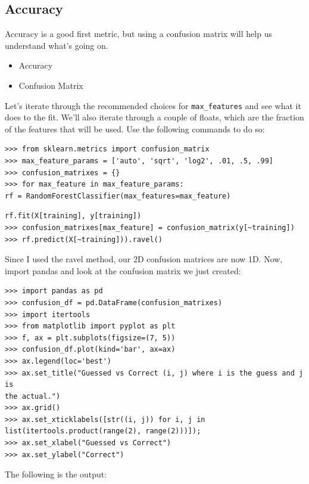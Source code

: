 \documentclass[SKL-MASTER.tex]{subfiles}
\begin{document}
\subsection*{Accuracy}
Accuracy is a good first metric, but using a confusion matrix will help
us understand what's going on.
\begin{itemize}
	\item Accuracy 
	\item Confusion Matrix
\end{itemize}
Let's iterate through the recommended choices for \texttt{max\_features} and see what it does to
the fit. We'll also iterate through a couple of floats, which are the fraction of the features that
will be used. Use the following commands to do so:
\begin{framed}
	\begin{verbatim}
>>> from sklearn.metrics import confusion_matrix
>>> max_feature_params = ['auto', 'sqrt', 'log2', .01, .5, .99]
>>> confusion_matrixes = {}
>>> for max_feature in max_feature_params:
rf = RandomForestClassifier(max_features=max_feature)
\end{verbatim}
\end{framed}
\begin{framed}
	\begin{verbatim}
rf.fit(X[training], y[training])
>>> confusion_matrixes[max_feature] = confusion_matrix(y[~training])
>>> rf.predict(X[~training])).ravel()
\end{verbatim}
\end{framed}
Since I used the ravel method, our 2D confusion matrices are now 1D.
Now, import pandas and look at the confusion matrix we just created:
\begin{framed}
\begin{verbatim}
>>> import pandas as pd
>>> confusion_df = pd.DataFrame(confusion_matrixes)
>>> import itertools
>>> from matplotlib import pyplot as plt
>>> f, ax = plt.subplots(figsize=(7, 5))
>>> confusion_df.plot(kind='bar', ax=ax)
>>> ax.legend(loc='best')
>>> ax.set_title("Guessed vs Correct (i, j) where i is the guess and j is
the actual.")
>>> ax.grid()
>>> ax.set_xticklabels([str((i, j)) for i, j in
list(itertools.product(range(2), range(2)))]);
>>> ax.set_xlabel("Guessed vs Correct")
>>> ax.set_ylabel("Correct")
\end{verbatim}
\end{framed}
The following is the output:
\end{document}
